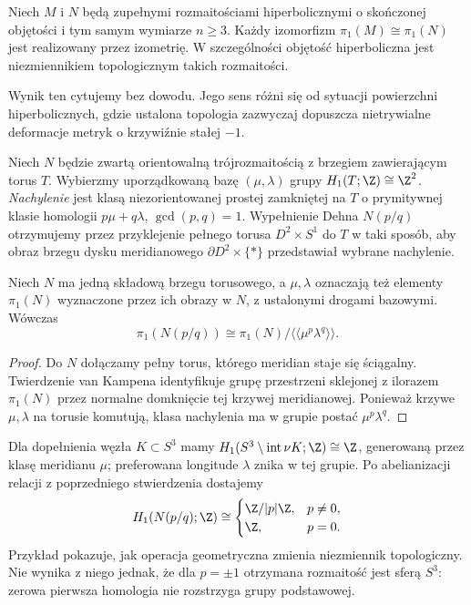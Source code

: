 \begin{twierdzenie}
\label{thm:thur-dop-mostow-prasad}
Niech $M$ i $N$ będą zupełnymi rozmaitościami
hiperbolicznymi o skończonej objętości i tym samym
wymiarze $n\ge3$. Każdy izomorfizm
$\pi_1(M)\cong\pi_1(N)$ jest realizowany przez izometrię.
W szczególności objętość hiperboliczna jest
niezmiennikiem topologicznym takich rozmaitości.
\end{twierdzenie}
Wynik ten cytujemy bez dowodu. Jego sens różni się od
sytuacji powierzchni hiperbolicznych, gdzie ustalona
topologia zazwyczaj dopuszcza nietrywialne deformacje
metryk o krzywiźnie stałej $-1$.

\begin{definicja}
\label{def:thur-dop-dehn-fill}
Niech $N$ będzie zwartą orientowalną trójrozmaitością
z brzegiem zawierającym torus $T$. Wybierzmy
uporządkowaną bazę $(\mu,\lambda)$ grupy
$H_1(T;\Z)\cong\Z^2$. \emph{Nachylenie} jest klasą
niezorientowanej prostej zamkniętej na $T$ o prymitywnej
klasie homologii $p\mu+q\lambda$, $\gcd(p,q)=1$.
Wypełnienie Dehna $N(p/q)$ otrzymujemy przez
przyklejenie pełnego torusa $D^2\times S^1$ do $T$
w taki sposób, aby obraz brzegu dysku meridianowego
$\partial D^2\times\{*\}$ przedstawiał wybrane nachylenie.
\end{definicja}

\begin{stwierdzenie}
\label{prop:thur-dop-dehn-pi1}
Niech $N$ ma jedną składową brzegu torusowego,
a $\mu,\lambda$ oznaczają też elementy $\pi_1(N)$
wyznaczone przez ich obrazy w $N$, z ustalonymi
drogami bazowymi. Wówczas
\[
 \pi_1(N(p/q))\cong
 \pi_1(N)/\langle\!\langle\mu^p\lambda^q\rangle\!\rangle.
\]
\end{stwierdzenie}
\begin{proof}
Do $N$ dołączamy pełny torus, którego meridian staje się
ściągalny. Twierdzenie van Kampena identyfikuje grupę
przestrzeni sklejonej z ilorazem $\pi_1(N)$ przez
normalne domknięcie tej krzywej meridianowej.
Ponieważ krzywe $\mu,\lambda$ na torusie komutują,
klasa nachylenia ma w grupie postać $\mu^p\lambda^q$.
\end{proof}

\begin{przyklad}
\label{prz:thur-dop-dehn-h1}
Dla dopełnienia węzła $K\subset S^3$ mamy
$H_1(S^3\setminus\operatorname{int}\nu K;\Z)\cong\Z$,
generowaną przez klasę meridianu $\mu$; preferowana
longitude $\lambda$ znika w tej grupie. Po abelianizacji
relacji z poprzedniego stwierdzenia dostajemy
\[
 H_1(N(p/q);\Z)\cong
 \begin{cases}\Z/|p|\Z,&p\ne0,\\\Z,&p=0.\end{cases}
\]
Przykład pokazuje, jak operacja geometryczna zmienia
niezmiennik topologiczny. Nie wynika z niego jednak,
że dla $p=\pm1$ otrzymana rozmaitość jest sferą $S^3$:
zerowa pierwsza homologia nie rozstrzyga grupy podstawowej.
\end{przyklad}

